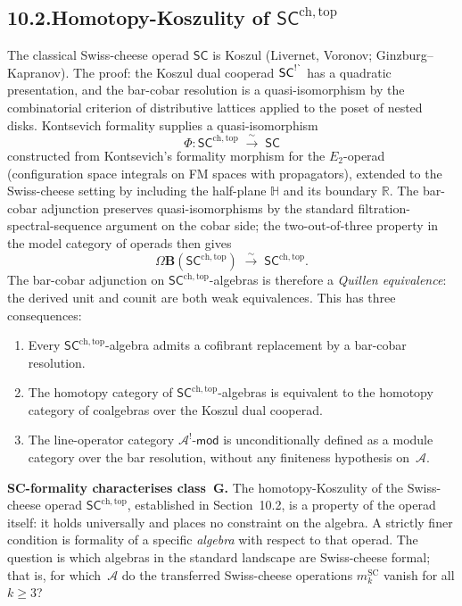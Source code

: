 \documentclass[11pt]{report}
\theoremstyle{definition}
\theoremstyle{remark}
\providecommand{\cA}{\mathcal{A}}
\numberwithin{equation}{section}
\begin{document}
\subsection*{10.2.\enspace Homotopy-Koszulity of $\mathsf{SC}^{\mathrm{ch,top}}$}

The classical Swiss-cheese operad $\mathsf{SC}$ is Koszul
(Livernet, Voronov; Ginzburg--Kapranov). The proof: the
Koszul dual cooperad $\mathsf{SC}^{\text{\raisebox{0.3ex}{!\textasciigrave}}}$
has a quadratic presentation, and the bar-cobar resolution is a
quasi-isomorphism by the combinatorial criterion of distributive
lattices applied to the poset of nested disks. Kontsevich formality
supplies a quasi-isomorphism
\[
\Phi\colon\mathsf{SC}^{\mathrm{ch,top}}
\;\xrightarrow{\;\sim\;}\;
\mathsf{SC}
\]
constructed from Kontsevich's formality morphism for the $E_2$-operad
(configuration space integrals on FM spaces with propagators), extended
to the Swiss-cheese setting by including the half-plane $\mathbb H$
and its boundary $\mathbb R$. The bar-cobar adjunction preserves
quasi-isomorphisms by the standard filtration-spectral-sequence
argument on the cobar side; the two-out-of-three property in the
model category of operads then gives
\[
\Omega\mathbf B(\mathsf{SC}^{\mathrm{ch,top}})
\;\xrightarrow{\;\sim\;}\;
\mathsf{SC}^{\mathrm{ch,top}}.
\]
The bar-cobar adjunction on
$\mathsf{SC}^{\mathrm{ch,top}}$-algebras is therefore a
\emph{Quillen equivalence}: the derived unit and counit are both
weak equivalences. This has three consequences:
\begin{enumerate}[label=(\roman*),nosep]
\item Every $\mathsf{SC}^{\mathrm{ch,top}}$-algebra admits a
 cofibrant replacement by a bar-cobar resolution.
\item The homotopy category of
 $\mathsf{SC}^{\mathrm{ch,top}}$-algebras is equivalent to the
 homotopy category of coalgebras over the Koszul dual cooperad.
\item The line-operator category $\cA^!\text{-}\mathsf{mod}$ is
 unconditionally defined as a module category over the bar
 resolution, without any finiteness hypothesis on~$\cA$.
\end{enumerate}

\medskip
\noindent\textbf{SC-formality characterises class~$\mathbf{G}$.}\enspace
The homotopy-Koszulity of the Swiss-cheese operad
$\mathsf{SC}^{\mathrm{ch,top}}$, established in Section~10.2,
is a property of the operad itself: it holds universally and
places no constraint on the algebra. A strictly finer condition
is formality of a specific \emph{algebra} with respect to that
operad. The question is which algebras in the standard landscape
are Swiss-cheese formal; that is, for which~$\cA$ do the
transferred Swiss-cheese operations
$m_k^{\mathrm{SC}}$ vanish for all $k \geq 3$?
\end{document}
